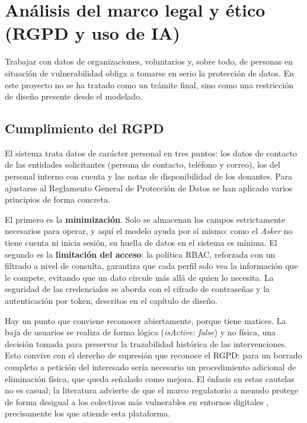 \documentclass[11pt,oneside,spanish,listoffigures,listoftables]{tfgetsinf}
\begin{document}
\section{Análisis del marco legal y ético (RGPD y uso de IA)}

Trabajar con datos de organizaciones, voluntarios y, sobre todo, de personas en situación de vulnerabilidad obliga a tomarse en serio la protección de datos. En este proyecto no se ha tratado como un trámite final, sino como una restricción de diseño presente desde el modelado.

\subsection{Cumplimiento del RGPD}

El sistema trata datos de carácter personal en tres puntos: los datos de contacto de las entidades solicitantes (persona de contacto, teléfono y correo), los del personal interno con cuenta y las notas de disponibilidad de los donantes. Para ajustarse al Reglamento General de Protección de Datos se han aplicado varios principios de forma concreta.

El primero es la \textbf{minimización}. Solo se almacenan los campos estrictamente necesarios para operar, y aquí el modelo ayuda por sí mismo: como el \textit{Asker} no tiene cuenta ni inicia sesión, su huella de datos en el sistema es mínima. El segundo es la \textbf{limitación del acceso}: la política RBAC, reforzada con un filtrado a nivel de consulta, garantiza que cada perfil solo vea la información que le compete, evitando que un dato circule más allá de quien lo necesita. La seguridad de las credenciales se aborda con el cifrado de contraseñas y la autenticación por token, descritos en el capítulo de diseño.

Hay un punto que conviene reconocer abiertamente, porque tiene matices. La baja de usuarios se realiza de forma lógica (\textit{isActive: false}) y no física, una decisión tomada para preservar la trazabilidad histórica de las intervenciones. Esto convive con el derecho de supresión que reconoce el RGPD: para un borrado completo a petición del interesado sería necesario un procedimiento adicional de eliminación física, que queda señalado como mejora. El énfasis en estas cautelas no es casual; la literatura advierte de que el marco regulatorio a menudo protege de forma desigual a los colectivos más vulnerables en entornos digitales \cite{vanzoonen2022data}, precisamente los que atiende esta plataforma.
\end{document}
